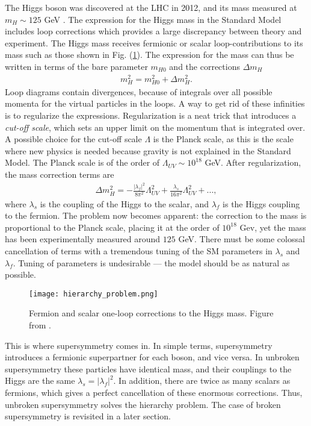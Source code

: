 \documentclass[twoside,english]{uiofysmaster}
\begin{document}
The Higgs boson was discovered at the LHC in 2012, and its mass  measured at $m_H \sim 125$ GeV \cite{20121}. The expression for the Higgs mass in the Standard Model includes loop corrections which provides a large discrepancy between theory and experiment. The Higgs mass receives fermionic or scalar loop-contributions to its mass such as those shown in Fig. (\ref{Fig:: Phys. bac.: Higgs mass contributions}). The expression for the mass can thus be written in terms of the bare parameter $m_{H0}$ and the corrections $\Delta m_H$
\begin{align*}
m_H^2 = m_{H0}^2 + \Delta m_H^2.
\end{align*}
Loop diagrams contain divergences, because of integrals over all possible momenta for the virtual particles in the loops. A way to get rid of these infinities is to regularize the expressions. Regularization is a neat trick that introduces a \textit{cut-off scale}, which sets an upper limit on the momentum that is integrated over. A possible choice for the cut-off scale $\Lambda$ is the Planck scale, as this is the scale where new physics is needed because gravity is not explained in the Standard Model. The Planck scale is of the order of $\Lambda_{UV} \sim 10^{18}$ GeV. After regularization, the mass correction terms are
\begin{align}
\Delta m_H^2 = - \frac{|\lambda_f|^2}{8\pi^2} \Lambda_{UV}^2 + \frac{\lambda_s}{16\pi^2} \Lambda_{UV}^2 +...,
\end{align}
where $\lambda_s$ is the coupling of the Higgs to the scalar, and $\lambda_f$ is the Higgs coupling to the fermion. The problem now becomes apparent: the correction to the mass is proportional to the Planck scale, placing it at the order of $10^{18}$ Gev, yet the mass has been experimentally measured around $125$ GeV. There must be some colossal cancellation of terms with a tremendous tuning of the SM parameters in $\lambda_s$ and $\lambda_f$. Tuning of parameters is undesirable --- the model should be as natural as possible. 

\begin{figure}[H]
\centering
\texttt{[image: hierarchy\_problem.png]}
\caption{Fermion and scalar one-loop corrections to the Higgs mass. Figure from \cite{batzing2017lecture}.}
\label{Fig:: Phys. bac.: Higgs mass contributions}
\end{figure}

This is where supersymmetry comes in. In simple terms, supersymmetry introduces a fermionic superpartner for each boson, and vice versa. In unbroken supersymmetry these particles have identical mass, and their couplings to the Higgs are the same $\lambda_s = |\lambda_f|^2$. In addition, there are twice as many scalars as fermions, which gives a perfect cancellation of these enormous corrections. Thus, unbroken supersymmetry solves the hierarchy problem. The case of broken supersymmetry is revisited in a later section.
\end{document}
